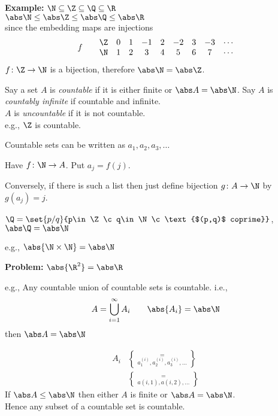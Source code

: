 \textbf{Example:} $\N\subseteq\Z\subseteq\Q\subseteq\R$ \\
$\abs\N\leq\abs\Z\leq\abs\Q\leq\abs\R$ \\
since the embedding maps are injections
\[f\qquad\begin{matrix}
\Z & 0 & 1 & -1 & 2 & -2 & 3 & -3 & \cdots \\
\N & 1 & 2 & 3 & 4 & 5 & 6 & 7 & \cdots
\end{matrix}\]
$f\colon\Z\to\N$ is a bijection, therefore $\abs\N=\abs\Z$.

 Say a set $A$ is \emph{countable} if it is either finite or $\abs A=\abs\N$.  Say $A$ is \emph{countably infinite} if countable and infinite. \\
$A$ is \emph{uncountable} if it is not countable. \\
e.g., $\Z$ is countable.

Countable sets can be written as $a_1,a_2,a_3,\dotsc$

Have $f\colon\N\to A$.  Put $a_j=f(j)$.

Conversely, if there is such a list then just define bijection $g\colon A\to\N$ by $g(a_j)=j$.

$\Q=\set{p/q}{p\in\Z\c q\in\N\c\text{$(p,q)$ coprime}}$,
%
$\abs\Q=\abs\N$

e.g., $\abs{\N\times\N}=\abs\N$

\textbf{Problem:} $\abs{\R^2}=\abs\R$

e.g., Any countable union of countable sets is countable.  i.e.,
\[ A = \bigcup_{i=1}^\infty A_i \qquad \abs{A_i}=\abs\N \]
then $\abs A=\abs\N$

\pf
\begin{align*}
A_i &= \brace{a^{(i)}_1,a^{(i)}_2,a^{(i)}_3,\dotsc} \\
    &= \brace{a(i,1),a(i,2),\dotsc}
\end{align*}
%
%
\prop If $\abs A\leq\abs\N$ then either $A$ is finite or $\abs A=\abs\N$. \\
\cor Hence any subset of a countable set is countable.
